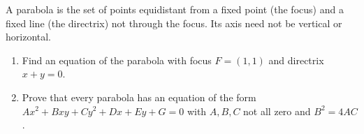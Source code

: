 A parabola is the set of points equidistant from a fixed point (the focus) and a fixed line (the directrix) not through the focus. Its axis need not be vertical or horizontal.
\begin{enumerate}
\item[(a)] Find an equation of the parabola with focus $F=(1,1)$ and directrix $x+y=0$.
\item[(b)] Prove that every parabola has an equation of the form $Ax^2+Bxy+Cy^2+Dx+Ey+G=0$ with $A,B,C$ not all zero and $B^2=4AC$.
\end{enumerate}
